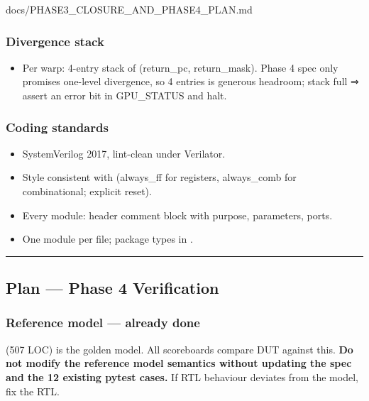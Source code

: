 \begin{relocated}{docs/PHASE3_CLOSURE_AND_PHASE4_PLAN.md}
\subsubsection{Divergence stack}\label{ds:ch:phase3-closure-phase4-plan:58-divergence-stack}

\begin{itemize}
\tightlist
\item
  Per warp: 4-entry stack of (return\_\allowbreak{}pc,
  return\_\allowbreak{}mask). Phase 4 spec only promises one-level
  divergence, so 4 entries is generous headroom; stack full ⇒ assert an
  error bit in GPU\_\allowbreak{}STATUS and halt.
\end{itemize}

\subsubsection{Coding standards}\label{ds:ch:phase3-closure-phase4-plan:59-coding-standards}

\begin{itemize}
\tightlist
\item
  SystemVerilog 2017, lint-clean under Verilator.
\item
  Style consistent with 
  (always\_\allowbreak{}ff for registers, always\_\allowbreak{}comb for
  combinational; explicit reset).
\item
  Every module: header comment block with purpose, parameters, ports.
\item
  One module per file; package types in .
\end{itemize}

\begin{center}\rule{0.5\linewidth}{0.5pt}\end{center}

\subsection{Plan --- Phase 4 Verification}\label{ds:ch:phase3-closure-phase4-plan:6-plan-phase-4-verification}

\subsubsection{Reference model --- already done}\label{ds:ch:phase3-closure-phase4-plan:61-reference-model-already-done}

 (507 LOC) is the golden model. All
scoreboards compare DUT against this. \textbf{Do not modify the
reference model semantics without updating the spec and the 12 existing
pytest cases.} If RTL behaviour deviates from the model, fix the RTL.


\end{relocated}
